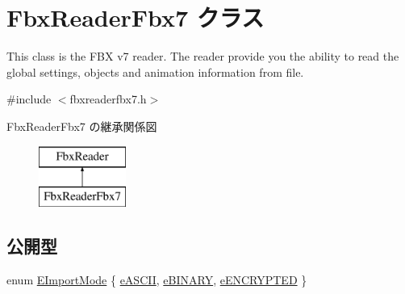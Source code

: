 \hypertarget{class_fbx_reader_fbx7}{}\section{Fbx\+Reader\+Fbx7 クラス}
\label{class_fbx_reader_fbx7}


This class is the F\+BX v7 reader. The reader provide you the ability to read the global settings, objects and animation information from file.  




{\ttfamily \#include $<$fbxreaderfbx7.\+h$>$}

Fbx\+Reader\+Fbx7 の継承関係図\begin{figure}[H]
\begin{center}
\leavevmode
\includegraphics[height=2.000000cm]{class_fbx_reader_fbx7}
\end{center}
\end{figure}
\subsection*{公開型}
\begin{DoxyCompactItemize}
\item 
enum \hyperlink{class_fbx_reader_fbx7_adac979509eca2b6dd882c24364e04a3a}{E\+Import\+Mode} \{ \hyperlink{class_fbx_reader_fbx7_adac979509eca2b6dd882c24364e04a3aa69cf32fabf9db79fd099956720a54256}{e\+A\+S\+C\+II}, 
\hyperlink{class_fbx_reader_fbx7_adac979509eca2b6dd882c24364e04a3aa701fc662c04bb2b80560887a21c55ae6}{e\+B\+I\+N\+A\+RY}, 
\hyperlink{class_fbx_reader_fbx7_adac979509eca2b6dd882c24364e04a3aa87a3b16cba8221426362c503c6c9cd65}{e\+E\+N\+C\+R\+Y\+P\+T\+ED}
 \}
\end{DoxyCompactItemize}
